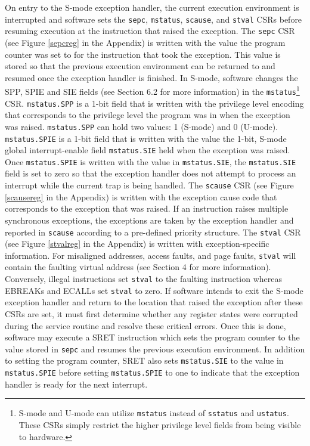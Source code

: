 \documentclass[12pt]{article}
\begin{document}
On entry to the S-mode exception handler, the current execution environment is interrupted and software sets the {\tt{sepc}}, {\tt{mstatus}}, {\tt{scause}}, and {\tt{stval}} CSRs before resuming execution at the instruction that raised the exception. The {\tt{sepc}} CSR (see Figure \ref{sepcreg} in the Appendix) is written with the value the program counter was set to for the instruction that took the exception. This value is stored so that the previous execution environment can be returned to and resumed once the exception handler is finished. In S-mode, software changes the SPP, SPIE and SIE fields (see Section 6.2 for more information) in the {\tt{mstatus}}\footnote[1]{S-mode and U-mode can utilize {\tt{mstatus}} instead of {\tt{sstatus}} and {\tt{ustatus}}. These CSRs simply restrict the higher privilege level fields from being visible to hardware.} CSR. {\tt{mstatus.SPP}} is a 1-bit field that is written with the privilege level encoding that corresponds to the privilege level the program was in when the exception was raised. {\tt{mstatus.SPP}} can hold two values: 1 (S-mode) and 0 (U-mode). {\tt{mstatus.SPIE}} is a 1-bit field that is written with the value the 1-bit, S-mode global interrupt-enable field {\tt{mstatus.SIE}} held when the exception was raised. Once {\tt{mstatus.SPIE}} is written with the value in {\tt{mstatus.SIE}}, the {\tt{mstatus.SIE}} field is set to zero so that the exception handler does not attempt to process an interrupt while the current trap is being handled. The {\tt{scause}} CSR (see Figure \ref{scausereg} in the Appendix) is written with the exception cause code that corresponds to the exception that was raised. If an instruction raises multiple synchronous exceptions, the exceptions are taken by the exception handler and reported in {\tt{scause}} according to a pre-defined priority structure. The {\tt{stval}} CSR (see Figure \ref{stvalreg} in the Appendix) is written with exception-specific information. For misaligned addresses, access faults, and page faults, {\tt{stval}} will contain the faulting virtual address (see Section 4 for more information). Conversely, illegal instructions set {\tt{stval}} to the faulting instruction whereas EBREAKs and ECALLs set {\tt{stval}} to zero. If software intends to exit the S-mode exception handler and return to the location that raised the exception after these CSRs are set, it must first determine whether any register states were corrupted during the service routine and resolve these critical errors. Once this is done, software may execute a SRET instruction which sets the program counter to the value stored in {\tt{sepc}} and resumes the previous execution environment. In addition to setting the program counter, SRET also sets {\tt{mstatus.SIE}} to the value in {\tt{mstatus.SPIE}} before setting {\tt{mstatus.SPIE}} to one to indicate that the exception handler is ready for the next interrupt. 
\end{document}
